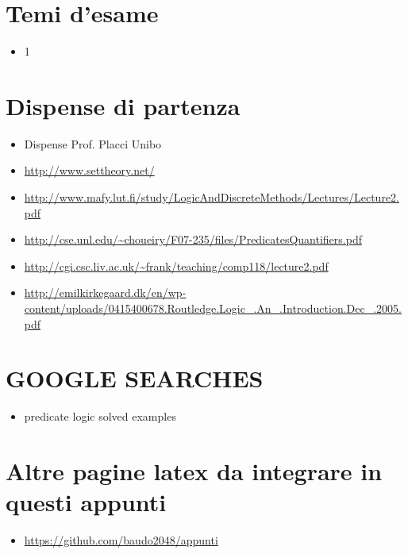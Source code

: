 \documentclass[a4paper,10pt]{article}
\begin{document}
\section{Temi d'esame}
  \begin{itemize}
   \item 1
  \end{itemize}

\section{Dispense di partenza}
\begin{itemize}
  \item Dispense Prof. Placci Unibo
  \item \url{http://www.settheory.net/}
  \item \url{http://www.mafy.lut.fi/study/LogicAndDiscreteMethods/Lectures/Lecture2.pdf}
  \item \url{http://cse.unl.edu/~choueiry/F07-235/files/PredicatesQuantifiers.pdf}
  \item \url{http://cgi.csc.liv.ac.uk/~frank/teaching/comp118/lecture2.pdf}
  \item \url{http://emilkirkegaard.dk/en/wp-content/uploads/0415400678.Routledge.Logic_.An_.Introduction.Dec_.2005.pdf}
\end{itemize}

\section{GOOGLE SEARCHES}
\begin{itemize}
 \item predicate logic solved examples
\end{itemize}

\section{Altre pagine latex da integrare in questi appunti}
\begin{itemize}
 \item \url{https://github.com/baudo2048/appunti}
\end{itemize}
\end{document}
